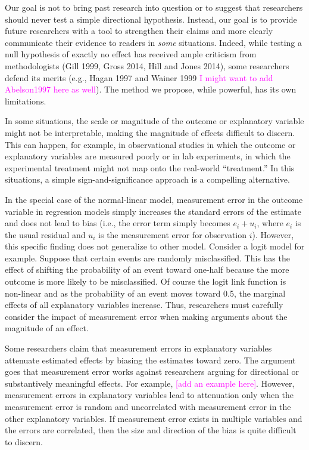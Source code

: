\documentclass[12pt]{article}
\newcommand{\carlisle}[1]{\textcolor{magenta}{#1}}
\begin{document}
Our goal is not to bring past research into question or to suggest that researchers should never test a simple directional hypothesis. Instead, our goal is to provide future researchers with a tool to strengthen their claims and more clearly communicate their evidence to readers in \textit{some} situations. Indeed, while testing a null hypothesis of exactly no effect has received ample criticism from methodologists (Gill 1999, Gross 2014, Hill and Jones 2014), some researchers defend its merits (e.g., Hagan 1997 and Wainer 1999 \carlisle{I might want to add Abelson1997 here as well}). The method we propose, while powerful, has its own limitations.

In some situations, the scale or magnitude of the outcome or explanatory variable might not be interpretable, making the magnitude of effects difficult to discern. This can happen, for example, in observational studies in which the outcome or explanatory variables are measured poorly or in lab experiments, in which the experimental treatment might not map onto the real-world ``treatment.'' In this situations, a simple sign-and-significance approach is a compelling alternative.


In the special case of the normal-linear model, measurement error in the outcome variable in regression models simply increases the standard errors of the estimate and does not lead to bias (i.e., the error term simply becomes $e_i + u_i$, where $e_i$ is the usual residual and $u_i$ is the measurement error for observation $i$). However, this specific finding does not generalize to other model. Consider a logit model for example. Suppose that certain events are randomly misclassified. This has the effect of shifting the probability of an event toward one-half because the more outcome is more likely to be misclassified. Of course the logit link function is non-linear and as the probability of an event moves toward 0.5, the marginal effects of all explanatory variables increase. Thus, researchers must carefully consider the impact of measurement error when making arguments about the magnitude of an effect.  


Some researchers claim that measurement errors in explanatory variables attenuate estimated effects by biasing the estimates toward zero. The argument goes that measurement error works against researchers arguing for directional or substantively meaningful effects. For example, \carlisle{[add an example here]}. However, measurement errors in explanatory variables lead to attenuation only when the measurement error is random and uncorrelated with measurement error in the other explanatory variables. If measurement error exists in multiple variables and the errors are correlated, then the size and direction of the bias is quite difficult to discern. 
\end{document}
